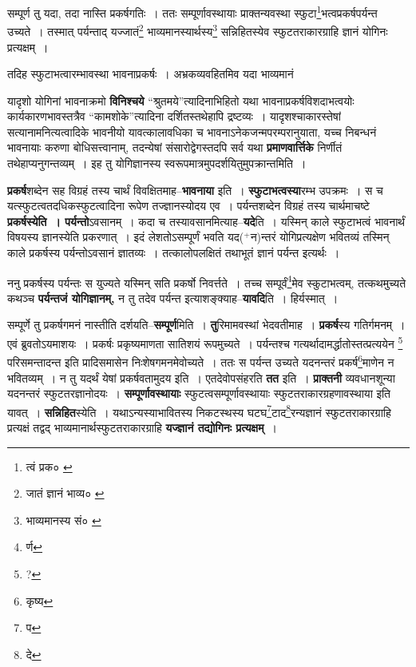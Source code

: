 \documentclass[article,12pt,a4paper]{memoir}
\newcommand{\add}[1]{($^{+}$#1)}
\begin{document}
	  \pstart सम्पूर्ण तु यदा, तदा नास्ति प्रकर्षगतिः । ततः सम्पूर्णावस्थायाः प्राक्तन्यवस्था स्फुटा\footnote{त्वं प्रक० \cite{dp-edE}}भत्वप्रकर्षपर्यन्त उच्यते । तस्मात् पर्यन्ताद् यज्जातं\footnote{जातं ज्ञानं भाव्य० \cite{dp-msC} \cite{dp-msD}} भाव्यमानस्यार्थस्य\footnote{भाव्यमानस्य सं० \cite{dp-msA} \cite{dp-msB} \cite{dp-edP} \cite{dp-edH} \cite{dp-edE}} सन्निहितस्येव स्फुटतराकारग्राहि ज्ञानं योगिनः प्रत्यक्षम् ।
	\pend
       

	  \pstart तदिह स्फुटाभत्वारम्भावस्था भावनाप्रकर्षः । अभ्रकव्यवहितमिव यदा भाव्यमानं
	\pend
      
	  \endgroup
	

	  \pstart यादृशो योगिनां भावनाक्रमो \textbf{विनिश्चये} “श्रुतमये”त्यादिनाभिहितो यथा भावनाप्रकर्षविशदाभत्वयोः कार्यकारणभावस्तत्रैव “कामशोके”त्यादिना दर्शितस्तथेहापि द्रष्टव्यः । यादृशश्चाकारस्तेषां सत्यानामनित्यत्वादिके भावनीयो यावत्कालावधिका च भावनाऽनेकजन्मपरम्परानुयाता, यच्च निबन्धनं भावनायाः करुणा बोधिसत्त्वानाम्, तदन्येषां संसारोद्वेगस्तदपि सर्व यथा \textbf{प्रमाणवार्त्तिके} निर्णीतं तथेहाप्यनुगन्तव्यम् । इह तु योगिज्ञानस्य स्वरूपमात्रमुपदर्शयितुमुपक्रान्तमिति ।
	\pend
      

	  \pstart \textbf{प्रकर्ष}शब्देन सह विग्रहं तस्य चार्थं विवक्षितमाह--\textbf{भावनाया} इति । \textbf{स्फुटाभत्वस्या}रम्भ उपक्रमः । स च यत्स्फुटत्वतदधिकस्फुटत्वादिना रूपेण तज्ज्ञानस्योदय एव । पर्यन्तशब्देन विग्रहं तस्य चार्थमाचष्टे \textbf{प्रकर्षस्येति । पर्यन्तो}ऽवसानम् । कदा च तस्यावसानमित्याह--\textbf{यदे}ति । यस्मिन् काले स्फुटाभत्वं भावनार्थं विषयस्य ज्ञानस्येति प्रकरणात् । इदं लेशतोऽसम्पूर्णं भवति यद\add{न}न्तरं योगिप्रत्यक्षेण भवितव्यं तस्मिन् काले प्रकर्षस्य पर्यन्तोऽवसानं ज्ञातव्यः । तत्कालोपलक्षितं तथाभूतं ज्ञानं पर्यन्त इत्यर्थः ।
	\pend
      

	  \pstart ननु प्रकर्षस्य पर्यन्तः स युज्यते यस्मिन् सति प्रकर्षो निवर्त्तते । तच्च सम्पूर्वं\footnote{र्ण}मेव स्कुटाभत्वम्, तत्कथमुच्यते कथञ्च \textbf{पर्यन्तजं योगिज्ञानम्,} न तु तदेव पर्यन्त इत्याशङ्क्याह--\textbf{यावदि}ति । हिर्यस्मात् ।
	\pend
      

	  \pstart सम्पूर्णे तु प्रकर्षगमनं नास्तीति दर्शयति--\textbf{सम्पूर्ण}मिति । \textbf{तु}रिमामवस्थां भेदवतीमाह । \textbf{प्रकर्ष}स्य गतिर्गमनम् । एवं ब्रुवतोऽयमाशयः । प्रकर्षः प्रकृष्यमाणता सातिशयं रूपमुच्यते । पर्यन्तश्च गत्यर्थादामर्द्धातोस्तत्प्रत्ययेन \footnote{?} परिसमन्तादन्त इति प्रादिसमासेन निःशेषगमनमेवोच्यते । ततः स पर्यन्त उच्यते यदनन्तरं प्रकर्ष\footnote{कृष्य}माणेन न भवितव्यम् । न तु यदर्थं येषां प्रकर्षवतामुदय इति । एतदेवोपसंहरति \textbf{तत} इति । \textbf{प्राक्तनी} व्यवधानशून्या यदनन्तरं स्फुटतरज्ञानोदयः । \textbf{सम्पूर्णावस्थायाः} स्फुटत्वसम्पूर्णावस्थायाः स्फुटतराकारग्रहणावस्थाया इति यावत् । \textbf{सन्निहित}स्येति । यथाऽन्यस्याभावितस्य निकटस्थस्य घटघ\footnote{प}टाद\footnote{दे}रन्यज्ञानं स्फुटतराकारग्राहि प्रत्यक्षं तद्वद् भाव्यमानार्थस्फुटतराकारग्राहि \textbf{यज्ज्ञानं तद्योगिनः प्रत्यक्षम्} ।
	\pend
      
\end{document}

